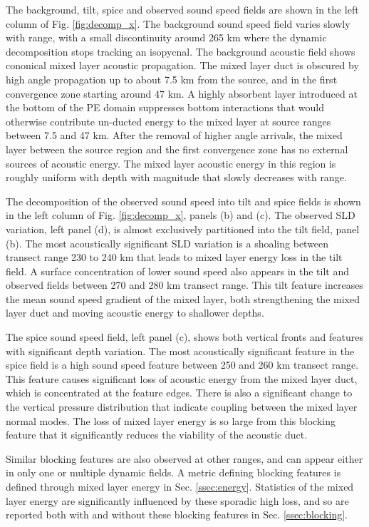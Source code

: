 \documentclass[preprint,NumberedRefs]{JASA}
\begin{document}
The background, tilt, spice and observed sound speed fields are shown in the left column of Fig. \ref{fig:decomp_x}. The background sound speed field varies slowly with range, with a small discontinuity around 265 km where the dynamic decomposition stops tracking an isopycnal. The background acoustic field shows cononical mixed layer acoustic propagation. The mixed layer duct is obscured by high angle propagation up to about 7.5 km from the source, and in the first convergence zone starting around 47 km. A highly absorbent layer introduced at the bottom of the PE domain suppresses bottom interactions that would otherwise contribute un-ducted energy to the mixed layer at source ranges between 7.5 and 47 km. After the removal of higher angle arrivals, the mixed layer between the source region and the first convergence zone has no external sources of acoustic energy. The mixed layer acoustic energy in this region is roughly uniform with depth with magnitude that slowly decreases with range.

The decomposition of the observed sound speed into tilt and spice fields is shown in the left column of Fig. \ref{fig:decomp_x}, panels (b) and (c). The observed SLD variation, left panel (d), is almost exclusively partitioned into the tilt field, panel (b). The most acoustically significant SLD variation is a shoaling between transect range 230 to 240 km that leads to mixed layer energy loss in the tilt field. A surface concentration of lower sound speed also appears in the tilt and observed fields between 270 and 280 km transect range. This tilt feature increases the mean sound speed gradient of the mixed layer, both strengthening the mixed layer duct and moving acoustic energy to shallower depths.

The spice sound speed field, left panel (c), shows both vertical fronts and features with significant depth variation. The most acoustically significant feature in the spice field is a high sound speed feature between 250 and 260 km transect range. This feature causes significant loss of acoustic energy from the mixed layer duct, which is concentrated at the feature edges. There is also a significant change to the vertical pressure distribution that indicate coupling between the mixed layer normal modes. The loss of mixed layer energy is so large from this blocking feature that it significantly reduces the viability of the acoustic duct.

Similar blocking features are also observed at other ranges, and can appear either in only one or multiple dynamic fields. A metric defining blocking features is defined through mixed layer energy in Sec. \ref{ssec:energy}. Statistics of the mixed layer energy are significantly influenced by these sporadic high loss, and so are reported both with and without these blocking features in Sec. \ref{ssec:blocking}.
\end{document}
